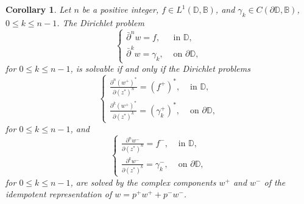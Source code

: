 \documentclass[12pt,reqno]{amsart}
\newtheorem{corr}[theorem]{Corollary}
\theoremstyle{definition}
\theoremstyle{remark}
\newcommand{\p}{\partial}
\newcommand{\dbar}{\bar\partial}
\newcommand{\bc}{\mathbb{B}}
\newcommand{\disk}{\mathbb{D}}
\begin{document}
            \begin{corr}\label{corr: bcdirichletiffcomplexdirichletforanyn}
                 Let $n$ be a positive integer, $f \in L^1(\disk, \bc)$, and $\gamma_k \in C(\p\disk, \bc)$, $0\leq k\leq n-1$. The Dirichlet problem
                \[
                    \begin{cases}
                        \dbar^n w = f, & \text{ in } \disk,\\
                        \dbar^k w = \gamma_k, & \text{ on } \p\disk,
                    \end{cases}
                \]
                for $0 \leq k \leq n-1$, is solvable if and only if the Dirichlet problems
                \[
                    \begin{cases}
                        \frac{\p^n (w^+)^*}{\p (z^*)^n} = (f^+)^*, & \text{ in } \disk,\\
                        \frac{\p^k (w^+)^*}{\p (z^*)^k} = (\gamma_k^+)^*, & \text{ on } \p\disk,
                    \end{cases}
                \]
                for $0 \leq k \leq n-1$, and
                \[
                    \begin{cases}
                         \frac{\p^n w^-}{\p (z^*)^n} = f^-, & \text{ in } \disk,\\
                        \frac{\p^k w^-}{\p (z^*)^k} = \gamma_k^-, & \text{ on } \p\disk,
                    \end{cases}
                \]
                for $0 \leq k \leq n-1$, are solved by the complex components $w^+$ and $w^-$ of the idempotent representation of $w = p^+ w^+ + p^- w^-$. 
            \end{corr}

            

            
\end{document}
